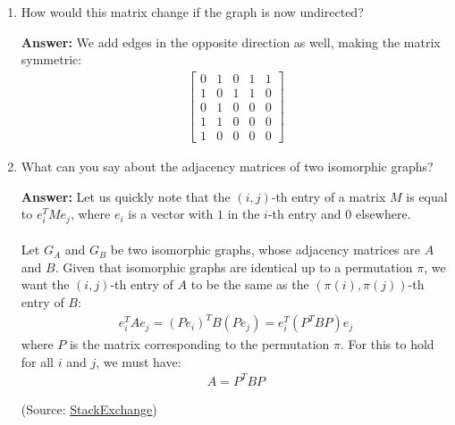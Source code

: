 \documentclass{article}
\newenvironment{QandA}{\begin{enumerate}[label=\arabic*.]}{\end{enumerate}}
\newenvironment{InnerQandA}{\begin{enumerate}[label=\roman*.]}{\end{enumerate}}
\newenvironment{answer}{\par\normalfont \textbf{Answer:}}{}
\begin{document}
\begin{QandA}
\begin{InnerQandA}
\begin{answer}
        \end{answer}

        \item How would this matrix change if the graph is now undirected?
        \begin{answer}
            We add edges in the opposite direction as well, making the matrix symmetric:
            \begin{align*}
                \begin{bmatrix}
                    0 & 1 & 0 & 1 & 1 \\
                    1 & 0 & 1 & 1 & 0 \\
                    0 & 1 & 0 & 0 & 0 \\
                    1 & 1 & 0 & 0 & 0 \\
                    1 & 0 & 0 & 0 & 0
                \end{bmatrix}
            \end{align*}
        \end{answer}

        \item What can you say about the adjacency matrices of two isomorphic graphs?
        \begin{answer}
            Let us quickly note that the $(i, j)$-th entry of a matrix $M$ is equal to $e_i^T M e_j$, where $e_i$ is a vector with $1$ in the $i$-th entry and $0$ elsewhere. \\\\
            Let $G_A$ and $G_B$ be two isomorphic graphs, whose adjacency matrices are $A$ and $B$. Given that isomorphic graphs are identical up to a permutation $\pi$, we want the $(i, j)$-th entry of $A$ to be the same as the $(\pi(i), \pi(j))$-th entry of $B$:
            \begin{align*}
                e_i^T A e_j = (Pe_i)^T B (Pe_j) = e_i^T (P^T B P) e_j
            \end{align*}
            where $P$ is the matrix corresponding to the permutation $\pi$. For this to hold for all $i$ and $j$, we must have:
            \begin{align*}
                 A = P^T B P
            \end{align*}
            
            (Source: \href{https://math.stackexchange.com/questions/181273/graph-isomorphism-as-permutation-matrix}{StackExchange})
        \end{answer}
    \end{InnerQandA}


\end{QandA}
\end{document}
